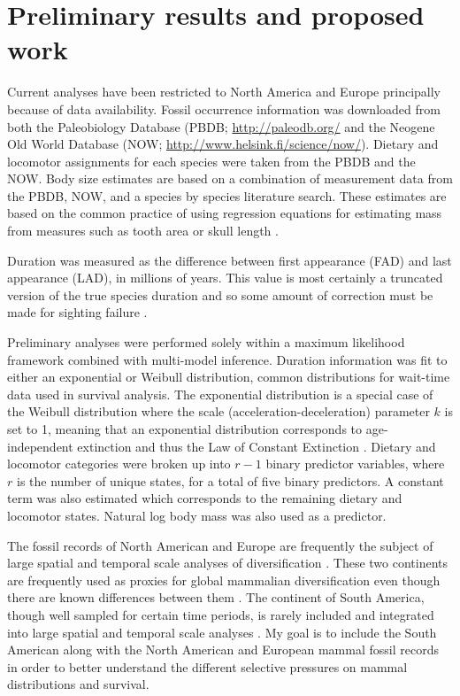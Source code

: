 \documentclass[11pt,letterpaper]{article}
\begin{document}

\section{Preliminary results and proposed work}
Current analyses have been restricted to North America and Europe principally because of data availability. Fossil occurrence information was downloaded from both the Paleobiology Database (PBDB; \url{http://paleodb.org/} and the Neogene Old World Database (NOW; \url{http://www.helsink.fi/science/now/}). Dietary and locomotor assignments for each species were taken from the PBDB and the NOW. Body size estimates are based on a combination of measurement data from the PBDB, NOW, and a species by species literature search. These estimates are based on the common practice of using regression equations for estimating mass from measures such as tooth area or skull length \citep{Alroy1998,Tomiya2013,Jernvall2004,Alroy2009,Slater2013a}.

Duration was measured as the difference between first appearance (FAD) and last appearance (LAD), in millions of years. This value is most certainly a truncated version of the true species duration and so some amount of correction must be made for sighting failure \citep{Alroy2014a,Solow1997,Strauss1989}.

Preliminary analyses were performed solely within a maximum likelihood framework combined with multi-model inference. Duration information was fit to either an exponential or Weibull distribution, common distributions for wait-time data used in survival analysis. The exponential distribution is a special case of the Weibull distribution where the scale (acceleration-deceleration) parameter \(k\) is set to 1, meaning that an exponential distribution corresponds to age-independent extinction and thus the Law of Constant Extinction \citep{VanValen1979}. Dietary and locomotor categories were broken up into \(r - 1\) binary predictor variables, where \(r\) is the number of unique states, for a total of five binary predictors. A constant term was also estimated which corresponds to the remaining dietary and locomotor states. Natural log body mass was also used as a predictor. 



The fossil records of North American and Europe are frequently the subject of large spatial and temporal scale analyses of diversification \citep{Jernvall2004,Jernvall2002,Fortelius2002,Janis2000,Alroy1996a,Alroy1998,Alroy2000g,Liow2008,Raia2006,Tomiya2013}. These two continents are frequently used as proxies for global mammalian diversification even though there are known differences between them \citep{Liow2008,Tomiya2013}. The continent of South America, though well sampled for certain time periods, is rarely included and integrated into large spatial and temporal scale analyses \citep{Stromberg2013,Marshall1982}. My goal is to include the South American along with the North American and European mammal fossil records in order to better understand the different selective pressures on mammal distributions and survival.
\end{document}
